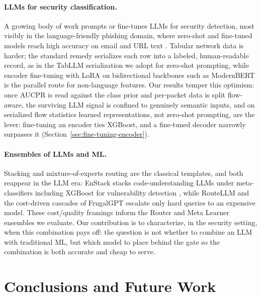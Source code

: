 \documentclass{jmlr}
\begin{document}
\paragraph{LLMs for security classification.}
A growing body of work prompts or fine-tunes LLMs for security detection, most visibly in the
language-friendly phishing domain, where zero-shot and fine-tuned models reach high accuracy on email
and URL text \citep{koide2024chatspamdetector}. Tabular network data is harder; the standard remedy
serializes each row into a labeled, human-readable record, as in the TabLLM serialization
\citep{hegselmann2023tabllm} we adopt for zero-shot prompting, while encoder fine-tuning with LoRA
\citep{hu2022lora} on bidirectional backbones such as ModernBERT \citep{warner2024modernbert} is the
parallel route for non-language features. Our results temper this optimism: once AUCPR
\citep{davis2006relationship} is read against the class prior and per-packet data is split flow-aware,
the surviving LLM signal is confined to genuinely semantic inputs, and on serialized flow statistics
learned representations, not zero-shot prompting, are the lever: fine-tuning an encoder ties XGBoost, and a fine-tuned decoder narrowly surpasses it (Section~\ref{sec:fine-tuning-encoder}).

\paragraph{Ensembles of LLMs and ML.}
Stacking
\citep{wolpert1992stacked} and mixture-of-experts routing \citep{jacobs1991adaptive} are the classical
templates, and both reappear in the LLM era: EnStack stacks code-understanding LLMs under
meta-classifiers including XGBoost for vulnerability detection \citep{ridoy2024enstack}, while RouteLLM
\citep{ong2024routellm} and the cost-driven cascades of FrugalGPT \citep{chen2023frugalgpt} escalate
only hard queries to an expensive model. These cost/quality framings inform the Router and Meta Learner
ensembles we evaluate. Our contribution is to characterize, in the security setting, when this
combination pays off: the question is not whether to combine an LLM with traditional ML, but which model
to place behind the gate so the combination is both accurate and cheap to serve.

\section{Conclusions and Future Work}
\label{sec:conclusion}
\end{document}
